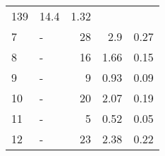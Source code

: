 \begin{longtable}{lXrrr}
       \num{139} &
       \num[round-mode=places,round-precision=2]{14.4} &
         \num[round-mode=places,round-precision=2]{1.32} \\

     7 &
     \multicolumn{1}{X}{ -  } &


       \num{28} &
       \num[round-mode=places,round-precision=2]{2.9} &
         \num[round-mode=places,round-precision=2]{0.27} \\

     8 &
     \multicolumn{1}{X}{ -  } &


       \num{16} &
       \num[round-mode=places,round-precision=2]{1.66} &
         \num[round-mode=places,round-precision=2]{0.15} \\

     9 &
     \multicolumn{1}{X}{ -  } &


       \num{9} &
       \num[round-mode=places,round-precision=2]{0.93} &
         \num[round-mode=places,round-precision=2]{0.09} \\

     10 &
     \multicolumn{1}{X}{ -  } &


       \num{20} &
       \num[round-mode=places,round-precision=2]{2.07} &
         \num[round-mode=places,round-precision=2]{0.19} \\

     11 &
     \multicolumn{1}{X}{ -  } &


       \num{5} &
       \num[round-mode=places,round-precision=2]{0.52} &
         \num[round-mode=places,round-precision=2]{0.05} \\

     12 &
     \multicolumn{1}{X}{ -  } &


       \num{23} &
       \num[round-mode=places,round-precision=2]{2.38} &
         \num[round-mode=places,round-precision=2]{0.22} \\


\end{longtable}
